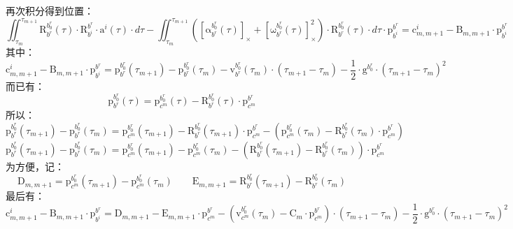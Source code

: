 \documentclass[12pt, onecolumn]{article}
\newcommand\liehat[1]{\left[ #1 \right]_\times}
\newcommand\bsm[1]{\boldsymbol{\mathrm{#1}}}
\newcommand\rotation[2]{{\bsm{R}_{#1}^{#2}}}
\newcommand\angvel[2]{{\bsm{\omega}_{#1}^{#2}}}
\newcommand\angacce[2]{{\bsm{\alpha}_{#1}^{#2}}}
\newcommand\translation[2]{{\bsm{p}_{#1}^{#2}}}
\newcommand\linvel[2]{{\bsm{v}_{#1}^{#2}}}
\newcommand\gravity[1]{{\bsm{g}^{#1}}}
\begin{document}
	再次积分得到位置：
	\begin{equation}
	\iint_{\tau_m}^{\tau_{m+1}}\rotation{b^r}{b^r_0}(\tau) \cdot\rotation{b^i}{b^r} \cdot\bsm{a}^i(\tau) \cdot d\tau-
	\iint_{\tau_m}^{\tau_{m+1}}\left(\liehat{\angacce{b^r}{b^r_0}(\tau)}+ \liehat{\angvel{b^r}{b^r_0}(\tau)}^2\right) \cdot\rotation{b^r}{b^r_0}(\tau)\cdot d\tau\cdot\translation{b^i}{b^r}
	=\bsm{c}^i_{m,m+1}-\bsm{B}_{m,m+1}\cdot\translation{b^i}{b^r}
	\end{equation}
	其中：
	\begin{equation}
	\bsm{c}^i_{m,m+1}-\bsm{B}_{m,m+1}\cdot\translation{b^i}{b^r}=
	\translation{b^r}{b^r_0}(\tau_{m+1})-\translation{b^r}{b^r_0}(\tau_m)
			-\linvel{b^r}{b^r_0}(\tau_m)\cdot\left(\tau_{m+1}-\tau_m \right)
			-\frac{1}{2}\cdot\gravity{b^r_0}\cdot\left(\tau_{m+1}-\tau_m \right)^2
	\end{equation}
	而已有：
	\begin{equation}
	\translation{b^r}{b^r_0}(\tau)=\translation{c^m}{b^r_0}(\tau)-\rotation{b^r}{b^r_0}(\tau)\cdot\translation{c^m}{b^r}
	\end{equation}
	所以：
	\begin{equation}
	\translation{b^r}{b^r_0}(\tau_{m+1})-\translation{b^r}{b^r_0}(\tau_m)=
	\translation{c^m}{b^r_0}(\tau_{m+1})-\rotation{b^r}{b^r_0}(\tau_{m+1})\cdot\translation{c^m}{b^r}-\left( 
	\translation{c^m}{b^r_0}(\tau_m)-\rotation{b^r}{b^r_0}(\tau_m)\cdot\translation{c^m}{b^r}
	\right) 
	\end{equation}
	\begin{equation}
	\translation{b^r}{b^r_0}(\tau_{m+1})-\translation{b^r}{b^r_0}(\tau_m)=
	\translation{c^m}{b^r_0}(\tau_{m+1})-\translation{c^m}{b^r_0}(\tau_{m}) -\left( \rotation{b^r}{b^r_0}(\tau_{m+1})-\rotation{b^r}{b^r_0}(\tau_m)\right) \cdot\translation{c^m}{b^r}
	\end{equation}
	为方便，记：
	\begin{equation}
	\bsm{D}_{m,m+1}= \translation{c^m}{b^r_0}(\tau_{m+1})-\translation{c^m}{b^r_0}(\tau_{m})
	\qquad
	\bsm{E}_{m,m+1}= \rotation{b^r}{b^r_0}(\tau_{m+1})-\rotation{b^r}{b^r_0}(\tau_m)
	\end{equation}
	最后有：
	\begin{equation}
	\bsm{c}^i_{m,m+1}-\bsm{B}_{m,m+1}\cdot\translation{b^i}{b^r}=
	\bsm{D}_{m,m+1}-\bsm{E}_{m,m+1}\cdot\translation{c^m}{b^r}
	-\left(\linvel{c^m}{b^r_0}(\tau_{m})-\bsm{C}_{m}\cdot\translation{c^m}{b^r} \right) \cdot\left(\tau_{m+1}-\tau_m \right)
	-\frac{1}{2}\cdot\gravity{b^r_0}\cdot\left(\tau_{m+1}-\tau_m \right)^2
	\end{equation}
	
\end{document}

